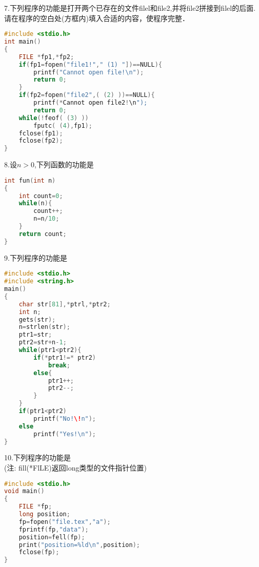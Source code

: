 7.下列程序的功能是打开两个已存在的文件filel和file2,并将file2拼接到filel的后面. \\
请在程序的空白处(方框内)填入合适的内容，使程序完整．
\begin{lstlisting}[language=cpp]
#include <stdio.h>
int main()
{
    FILE *fp1,*fp2;
    if(fp1=fopen("file1!"," (1) "])==NULL){
        printf("Cannot open file!\n");
        return 0;
    }
    if(fp2=fopen("file2",( (2) ))==NULL){
        printf(*Cannot open file2!\n");
        return 0;
    while(!feof( (3) ))
        fputc( (4),fp1);
    fclose(fp1);
    fclose(fp2);
}
\end{lstlisting}

8.设$n>0$,下列函数的功能是  \\
\begin{lstlisting}[language=cpp]
int fun(int n)
{
    int count=0;
    while(n){
        count++;
        n=n/10;
    }
    return count;
}
\end{lstlisting}

9.下列程序的功能是 \\
\begin{lstlisting}[language=cpp]
#include <stdio.h>
#include <string.h>
main()
{
    char str[81],*ptrl,*ptr2;
    int n;
    gets(str);
    n=strlen(str);
    ptr1=str;
    ptr2=str+n-1;
    while(ptr1<ptr2){
        if(*ptr1!=* ptr2)
            break;
        else{
            ptr1++;
            ptr2--;
        }
    }
    if(ptr1<ptr2)
        printf("No!\!n");
    else
        printf("Yes!\n");
}
\end{lstlisting}

10.下列程序的功能是 \\
(注: fill(*FlLE)返回long类型的文件指针位置)
\begin{lstlisting}[language=cpp]
#include <stdio.h>
void main()
{
    FILE *fp;
    long position;
    fp=fopen("file.tex","a");
    fprintf(fp,"data");
    position=fell(fp);
    print("position=%ld\n",position);
    fclose(fp);
}
\end{lstlisting}